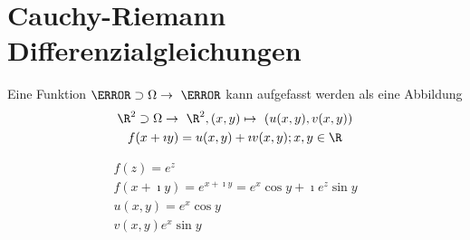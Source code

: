 \section{Cauchy-Riemann Differenzialgleichungen}
Eine Funktion $\C \supset \Omega \rightarrow \C$ kann aufgefasst werden als eine Abbildung
\begin{gather*}
	\R^2 \supset \Omega \rightarrow \R^2 , (x,y) \mapsto (u(x,y) , v(x,y)) \\
	f(x+\imath y) = u(x,y) + \imath v(x,y) ; x , y \in \R
\end{gather*}
\begin{bsp*}
	\begin{gather*}
		f(z) = e^z \\
		f(x + \imath y) = e^{x + \imath y} = e^x \cos y + \imath e^z \sin y \\
		u(x,y) = e^x \cos y \\
		v(x,y) e^x \sin y
	\end{gather*}
\end{bsp*}

